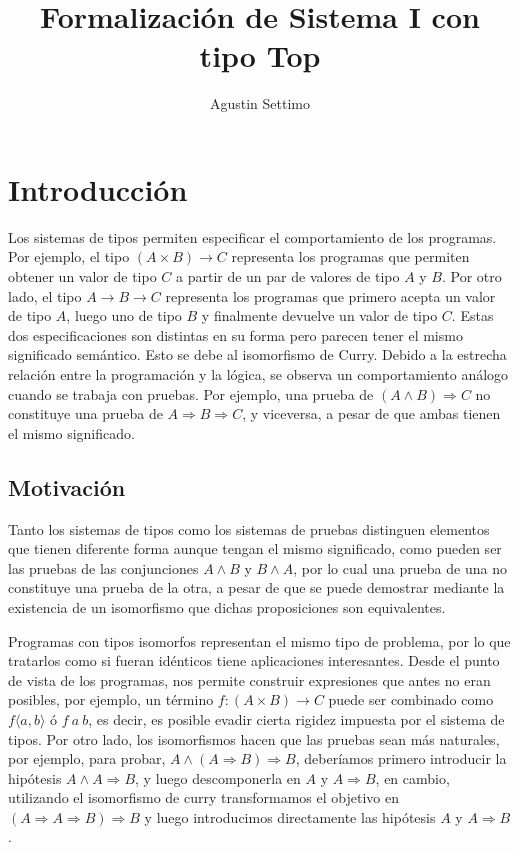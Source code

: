 \documentclass[]{report}
\title{Formalización de Sistema I con tipo Top}
\author{Agustin Settimo}
\begin{document}
	
	\maketitle
	\tableofcontents
	
	\begin{abstract}
		
	\end{abstract}
	
	\chapter{Introducción}
	Los sistemas de tipos permiten especificar el comportamiento de los programas.
	Por ejemplo, el tipo $(A \times B) \rightarrow C$ representa los programas que permiten obtener un valor de tipo $C$ a partir de un par de valores de tipo $A$ y $B$.
	Por otro lado, el tipo $A \rightarrow B \rightarrow C$ representa los programas que primero acepta un valor de tipo $A$, luego uno de tipo $B$ y finalmente devuelve un valor de tipo $C$.
	Estas dos especificaciones son distintas en su forma pero parecen tener el mismo significado semántico. Esto se debe al isomorfismo de Curry.
	Debido a la estrecha relación entre la programación y la lógica, se observa un comportamiento análogo cuando se trabaja con pruebas.
	Por ejemplo, una prueba de $(A \wedge B) \Rightarrow C$ no constituye una prueba de $A \Rightarrow B \Rightarrow C$, y viceversa, a pesar de que ambas tienen el mismo significado.
	
	\section{Motivación}
	
	Tanto los sistemas de tipos como los sistemas de pruebas distinguen elementos que tienen diferente forma aunque tengan el mismo significado, como pueden ser las pruebas de las conjunciones $A \wedge B$ y $B \wedge A$, por lo cual una prueba de una no constituye una prueba de la otra, a pesar de que se puede demostrar mediante la existencia de un isomorfismo que dichas proposiciones son equivalentes.
	
	Programas con tipos isomorfos representan el mismo tipo de problema, por lo que tratarlos como si fueran idénticos tiene aplicaciones interesantes.
	Desde el punto de vista de los programas, nos permite construir expresiones que antes no eran posibles, por ejemplo, un término $f : (A \times B) \rightarrow C$ puede ser combinado como $f \langle a, b \rangle$ ó $f \: a \: b$, es decir, es posible evadir cierta rigidez impuesta por el sistema de tipos.
	Por otro lado, los isomorfismos hacen que las pruebas sean más naturales, por ejemplo, para probar, $A \wedge (A \Rightarrow  B) \Rightarrow B$, deberíamos primero introducir la hipótesis $A \wedge A \Rightarrow  B$, y luego descomponerla en $A$ y $A \Rightarrow B$, en cambio, utilizando el isomorfismo de curry transformamos el objetivo en $(A \Rightarrow A \Rightarrow  B) \Rightarrow B$ y luego introducimos directamente las hipótesis $A$ y $A \Rightarrow B$.
	
\end{document}
